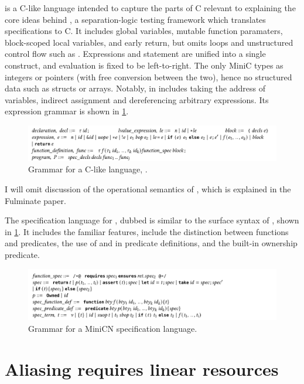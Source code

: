  is a C-like language intended to capture the parts of C relevant to
explaining the core ideas behind
, a separation-logic testing
framework which translates  specifications to C. It includes global
variables, mutable function paramaters, block-scoped local variables, and early
return, but omits loops and unstructured control flow such as .
Expressions and statement are unified into a single construct, and evaluation
is fixed to be left-to-right. The only MiniC types as integers or pointers
(with free conversion between the two), hence no structured data such as
structs or arrays. Notably, in  includes taking the address of
variables, indirect assignment and dereferencing arbitrary expressions. Its
expression grammar is shown in \cref{fig:minic-grammar}.

\begin{figure}[tp]
    \includegraphics{figures/mini-c-grammar}
    \caption{Grammar for a C-like language, .}\label{fig:minic-grammar}
\end{figure}

I will omit discussion of the operational semantics of , which is
explained in the Fulminate paper.

The specification language for , dubbed  is similar to the
surface syntax of , shown in \cref{fig:minic-grammar}. It includes the
familiar features, include the distinction between functions and predicates,
the use of  and  in predicate definitions, and
the built-in ownership predicate.

\begin{figure}[tp]
    \includegraphics{figures/minicn-grammar}
    \caption{Grammar for a MiniCN specification language.}\label{fig:minicn-grammar}
\end{figure}

\section{Aliasing requires linear resources}

